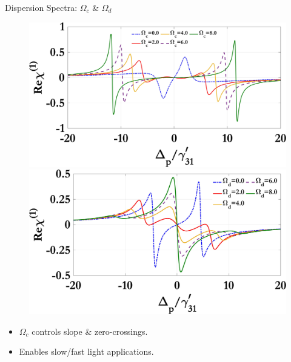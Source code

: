 \documentclass{beamer}
\begin{document}
\begin{frame}{Dispersion Spectra: $\Omega_c$ \& $\Omega_d$}
  \vspace{-37pt}
  \begin{figure}[h]
    \centering
    \begin{minipage}{0.48\textwidth}
      \centering
      \includegraphics[width=\linewidth]{Assets/Real_chi1_Omega_c.jpeg}
      \subcaption{}
    \end{minipage}
    \hfill
    \begin{minipage}{0.48\textwidth}
      \centering
      \includegraphics[width=\linewidth]{Assets/Real_chi1_Omega_d.jpeg}
      \subcaption{}
    \end{minipage}\label{fig:real-chi1}
   \end{figure}\begin{itemize}
    \item $\Omega_c$ controls slope \& zero-crossings.
    \item Enables slow/fast light applications.
  \end{itemize}
\end{frame}
\end{document}

